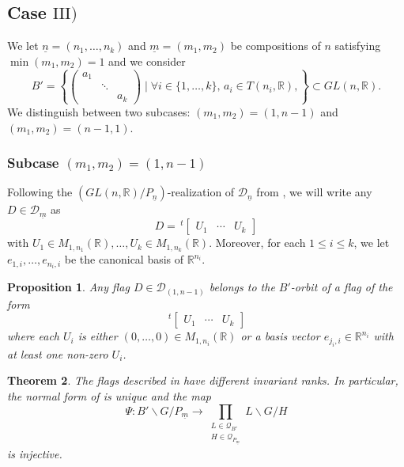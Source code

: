 \documentclass[pdftex]{sigma}
\numberwithin{equation}{section}
\newtheorem{Theorem}{Theorem}[section]
\newtheorem{Proposition}[Theorem]{Proposition}
\theoremstyle{definition}
\newcommand{\R}{\mathbb{R}}
\newcommand{\D}{\mathcal{D}}
\newcommand{\T}{T}
\theoremstyle{plain}
\theoremstyle{plain}
\theoremstyle{plain}
\theoremstyle{plain}
\begin{document}
\subsection[Case III)]{Case $\mathrm{III})$} \label{cas 3}

We let $\underline n = (n_1,\dots,n_k)$ and $\underline m = (m_1,m_2)$ be compositions of $n$ satisfying $\min(m_1,m_2) = 1$ and we consider
\begin{equation*}
	B' = \left\{\begin{pmatrix}
	a_1 &  &  \\
	& \ddots & \\
	&  & a_k
\end{pmatrix} \mid \forall i \in \{1,\dots,k\}, \, a_i \in \T(n_i,\R),\right\} \subset GL(n,\R).
\end{equation*}
We distinguish between two subcases: $(m_1,m_2) = (1,n-1)$ and $(m_1,m_2) = (n-1,1)$.

\subsubsection*{Subcase $(m_1,m_2) = (1,n-1)$}

Following the $(GL(n,\R)/P_{\underline n})$-realization of $\D_{\underline n}$ from , we will write any $D \in \D_{\underline m}$ as
\begin{equation*}
	D = \,^t\begin{bmatrix}
	U_1 & \cdots & U_k
\end{bmatrix}
\end{equation*}
with $U_1 \in M_{1,n_1}(\R),\dots, U_k \in M_{1,n_k}(\R)$. Moreover, for each $1 \leqslant i \leqslant k$, we let $e_{1,i},\dots,e_{n_i,i}$ be the canonical basis of $\R^{n_i}$.

\begin{Proposition}{\label{orbits III1}}
	Any flag $D \in \D_{(1,n-1)}$ belongs to the $B'$-orbit of a flag of the form
	\begin{equation*}
		\,^t\begin{bmatrix}
		U_1 & \cdots & U_k
	\end{bmatrix}
	\end{equation*}
	where each $U_i$ is either $(0,\dots,0) \in M_{1,n_i}(\R)$ or a basis vector $e_{j_i,i} \in \R^{n_i}$ with at least one non-zero $U_i$.
\end{Proposition}

\begin{Theorem}
	The flags described in  have different invariant ranks. In particular, the normal form of  is unique and the map
	\begin{equation*}
		\Psi : B'\backslash G/P_{\underline m} \to \displaystyle \prod_{\substack{L \in \mathcal Q_{B'} \\ H \in \mathcal Q_{P_{\underline m}}}} L\backslash G/H
	\end{equation*}
	is injective.
\end{Theorem}
\end{document}
